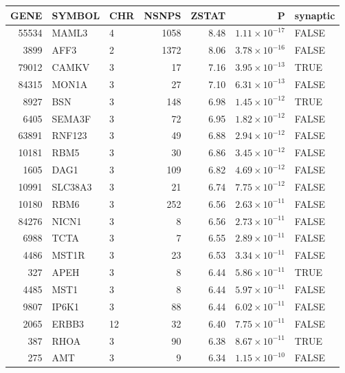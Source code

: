 

\begin{table}[ht]
\centering
\begin{adjustbox}{totalheight=10in}


\begin{tabular}{rllrrrl}
  \hline
GENE & SYMBOL & CHR & NSNPS & ZSTAT & P & synaptic \\ 
  \hline
55534 & MAML3 & 4 & 1058 & 8.48 & $1.11 \times 10^{-17}$ & FALSE \\ 
  3899 & AFF3 & 2 & 1372 & 8.06 & $3.78 \times 10^{-16}$ & FALSE \\ 
  79012 & CAMKV & 3 &  17 & 7.16 & $3.95 \times 10^{-13}$ & TRUE \\ 
  84315 & MON1A & 3 &  27 & 7.10 & $6.31 \times 10^{-13}$ & FALSE \\ 
  8927 & BSN & 3 & 148 & 6.98 & $1.45 \times 10^{-12}$ & TRUE \\ 
  6405 & SEMA3F & 3 &  72 & 6.95 & $1.82 \times 10^{-12}$ & FALSE \\ 
  63891 & RNF123 & 3 &  49 & 6.88 & $2.94 \times 10^{-12}$ & FALSE \\ 
  10181 & RBM5 & 3 &  30 & 6.86 & $3.45 \times 10^{-12}$ & FALSE \\ 
  1605 & DAG1 & 3 & 109 & 6.82 & $4.69 \times 10^{-12}$ & FALSE \\ 
  10991 & SLC38A3 & 3 &  21 & 6.74 & $7.75 \times 10^{-12}$ & FALSE \\ 
  10180 & RBM6 & 3 & 252 & 6.56 & $2.63 \times 10^{-11}$ & FALSE \\ 
  84276 & NICN1 & 3 &   8 & 6.56 & $2.73 \times 10^{-11}$ & FALSE \\ 
  6988 & TCTA & 3 &   7 & 6.55 & $2.89 \times 10^{-11}$ & FALSE \\ 
  4486 & MST1R & 3 &  23 & 6.53 & $3.34 \times 10^{-11}$ & FALSE \\ 
  327 & APEH & 3 &   8 & 6.44 & $5.86 \times 10^{-11}$ & TRUE \\ 
  4485 & MST1 & 3 &   8 & 6.44 & $5.97 \times 10^{-11}$ & FALSE \\ 
  9807 & IP6K1 & 3 &  88 & 6.44 & $6.02 \times 10^{-11}$ & FALSE \\ 
  2065 & ERBB3 & 12 &  32 & 6.40 & $7.75 \times 10^{-11}$ & FALSE \\ 
  387 & RHOA & 3 &  90 & 6.38 & $8.67 \times 10^{-11}$ & TRUE \\ 
  275 & AMT & 3 &   9 & 6.34 & $1.15 \times 10^{-10}$ & FALSE \\ 

\end{tabular}
\end{adjustbox}
\end{table}
